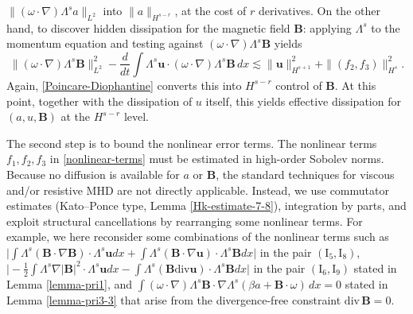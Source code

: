\documentclass[12pt, reqno]{amsart}
\numberwithin{equation}{section}
\numberwithin{equation}{section}
\numberwithin{equation}{section}
\numberwithin{equation}{section}
\theoremstyle{remark}
\def\u{ \mathbf{u} }
\def\b{ \mathbf{B} }
\begin{document}
$\|(\omega\cdot\nabla)\Lambda^s a\|_{L^2}$ into $\|a\|_{H^{s-r}}$, at the cost
of $r$ derivatives. On the other hand,
to discover hidden dissipation for the magnetic field $\b$:
applying $\Lambda^s$ to the momentum equation and testing against
$(\omega\cdot\nabla)\Lambda^s\b$ yields
\begin{equation}\label{magnetic-dissipation-sketch}
	\|(\omega\cdot\nabla)\Lambda^s\b\|_{L^2}^2
	- \frac{d}{dt}\int\Lambda^s\mathbf{u}\cdot(\omega\cdot\nabla)\Lambda^s\b\,dx
	\lesssim \|\mathbf{u}\|_{H^{s+1}}^2+\|(f_2,f_3)\|_{H^s}^2.
\end{equation}
Again, \eqref{Poincare-Diophantine} converts this into $H^{s-r}$ control
of $\b$.  At this point, together with the dissipation of $u$ itself, this yields effective dissipation for $(a,u,\b)$ at the $H^{s-r}$  level.  %

\medskip
The second step is to bound the nonlinear error terms.
The nonlinear terms $f_1, f_2, f_3$ in \eqref{nonlinear-terms} must be
estimated in high-order Sobolev norms.  Because no diffusion is available
for $a$ or $\b$, the standard techniques for viscous and/or
resistive MHD
\cite{Dong-Wu-Zhai,L-X-Z,Li-Xu-Zhai,L-H,L-H1,Suen,SuenA,Wu-Xu-Zhai,Wu-Zhai,Wu-Zhu}
are not directly applicable.  Instead, we use commutator estimates
(Kato--Ponce type, Lemma \ref{Hk-estimate-7-8}), integration by parts, and exploit
structural cancellations  by rearranging some nonlinear terms. For example, we here reconsider some combinations of the nonlinear terms  such as $\big|\int\Lambda^s(\b\cdot\nabla \b)\cdot\Lambda^s \u dx+\int\Lambda^s(\b\cdot\nabla \u)\cdot\Lambda^s\b dx\big|$ in the pair $(\mathrm I_5,\mathrm I_8)$, $\big|-\frac12\int\Lambda^s\nabla|\b|^2\cdot\Lambda^s\u dx-\int\Lambda^s(\b\textrm{div}\u)\cdot\Lambda^s\b dx\big|$ in the pair $(\mathrm I_6,\mathrm I_9)$ stated in Lemma \ref{lemma-pri1},  and  $\int(\omega\cdot\nabla)\Lambda^{s}\b\cdot\nabla\Lambda^{s}(\beta a+ \b\cdot\omega)\,dx=0$ stated in Lemma \ref{lemma-pri3-3}  that arise from the divergence-free constraint $\mathrm{div}\,\b=0$.
\end{document}
